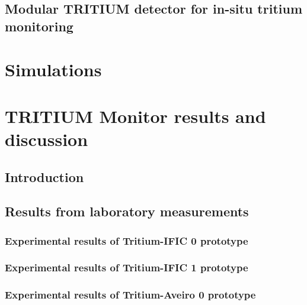 \documentclass[12pt,a4paper]{book}
\begin{document}
	\section[Modular TRITIUM detector]{Modular TRITIUM detector for in-situ tritium monitoring}\label{sec:TritiumMonitor}
	
	\newpage

\chapter{Simulations}  \label{chap:Simulations}
\newpage
	
\chapter[Results and discussion]{TRITIUM Monitor results and discussion}\label{chap:ResultsPrototypes}
	\section{Introduction}\label{sec:IntroResultsPrototypes}
	
	\newpage
	
	\section{Results from laboratory measurements}\label{sec:ResultsLaboratoryPrototypes}
	
	\newpage
		
		\subsection{Experimental results of Tritium-IFIC 0 prototype}\label{subsec:ResultsTritiumIFIC0}
		
		
		\subsection{Experimental results of Tritium-IFIC 1 prototype}\label{subsec:ResultsTritiumIFIC1}
		
		
		\subsection{Experimental results of Tritium-Aveiro 0 prototype}\label{subsec:ResultsTritiumAveiro}
		
		
\end{document}
